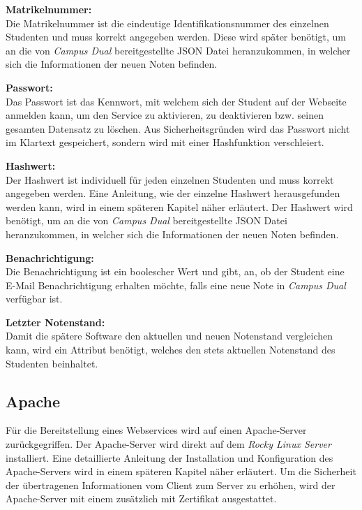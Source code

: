 \textbf{Matrikelnummer:}\\
Die Matrikelnummer ist die eindeutige Identifikationsnummer des einzelnen Studenten und muss korrekt angegeben werden.
Diese wird später benötigt, um an die von \textit{Campus Dual} bereitgestellte \ac{JSON} Datei heranzukommen, in welcher sich die Informationen der neuen Noten befinden.

\textbf{Passwort:}\\
Das Passwort ist das Kennwort, mit welchem sich der Student auf der Webseite anmelden kann, um den Service zu aktivieren, zu deaktivieren bzw. seinen gesamten Datensatz zu löschen.
Aus Sicherheitsgründen wird das Passwort nicht im Klartext gespeichert, sondern wird mit einer Hashfunktion verschleiert.

\textbf{Hashwert:}\\
Der Hashwert ist individuell für jeden einzelnen Studenten und muss korrekt angegeben werden.
Eine Anleitung, wie der einzelne Hashwert herausgefunden werden kann, wird in einem späteren Kapitel näher erläutert.
Der Hashwert wird benötigt, um an die von \textit{Campus Dual} bereitgestellte \ac{JSON} Datei heranzukommen, in welcher sich die Informationen der neuen Noten befinden.

\textbf{Benachrichtigung:}\\
Die Benachrichtigung ist ein boolescher Wert und gibt, an, ob der Student eine E-Mail Benachrichtigung erhalten möchte, falls eine neue Note in \textit{Campus Dual} verfügbar ist.

\textbf{Letzter Notenstand:}\\
Damit die spätere Software den aktuellen und neuen Notenstand vergleichen kann, wird ein Attribut benötigt, welches den stets aktuellen Notenstand des Studenten beinhaltet.

\subsection{Apache}
Für die Bereitstellung eines Webservices wird auf einen Apache-Server zurückgegriffen.
Der Apache-Server wird direkt auf dem \textit{Rocky Linux Server} installiert.
Eine detaillierte Anleitung der Installation und Konfiguration des Apache-Servers wird in einem späteren Kapitel näher erläutert.
Um die Sicherheit der übertragenen Informationen vom Client zum Server zu erhöhen, wird der Apache-Server mit einem zusätzlich mit Zertifikat ausgestattet.

